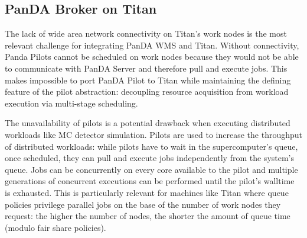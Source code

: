 

\subsection{PanDA Broker on Titan}
\label{ssec:panda_titan}

The lack of wide area network connectivity on Titan's work nodes is the most
relevant challenge for integrating PanDA WMS and Titan. Without connectivity,
Panda Pilots cannot be scheduled on work nodes because they would not be able to
communicate with PanDA Server and therefore pull and execute jobs. This makes
impossible to port PanDA Pilot to Titan while maintaining the defining feature
of the pilot abstraction: decoupling resource acquisition from workload
execution via multi-stage scheduling.

The unavailability of pilots is a potential drawback when executing distributed
workloads like MC
detector simulation. Pilots are used to increase the throughput of distributed
workloads: while pilots have to wait in the supercomputer's queue, once
scheduled, they can pull and execute jobs independently from the system's queue.
Jobs can be concurrently on every core available to the pilot and multiple
generations of concurrent executions can be performed until the pilot's walltime
is exhausted. This is particularly relevant for machines like Titan where queue
policies privilege parallel jobs on the base of the number of work nodes they
request: the higher the number of nodes, the shorter the amount of queue time
(modulo fair share policies).


